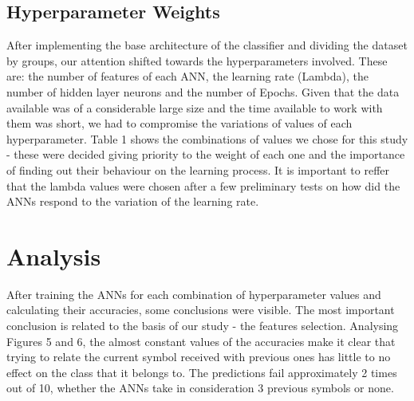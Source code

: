 \documentclass[10pt]{IEEEtran}
\begin{document}
\subsection{Hyperparameter Weights}
After implementing the base architecture of the classifier and dividing the dataset by groups, our attention shifted towards the hyperparameters involved. These are: the number of features of each ANN, the learning rate (Lambda), the number of hidden layer neurons and the number of Epochs. Given that the data available was of a considerable large size and the time available to work with them was short, we had to compromise the variations of values of each hyperparameter. Table 1 shows the combinations of values we chose for this study - these were decided giving priority to the weight of each one and the importance of finding out their behaviour on the learning process. It is important to reffer that the lambda values were chosen after a few preliminary tests on how did the ANNs respond to the variation of the learning rate.

\FloatBarrier
\begin{table}[h]
\caption{Combinations of hyperparameters tested}
\end{table}
\FloatBarrier

\section{Analysis} %

After training the ANNs for each combination of hyperparameter values and calculating their accuracies, some conclusions were visible. 
The most important conclusion is related to the basis of our study - the features selection. Analysing Figures 5 and 6, the almost constant values of the accuracies make it clear that trying to relate the current symbol received with previous ones has little to no effect on the class that it belongs to. The predictions fail approximately 2 times out of 10, whether the ANNs take in consideration 3 previous symbols or none. 
\end{document}
